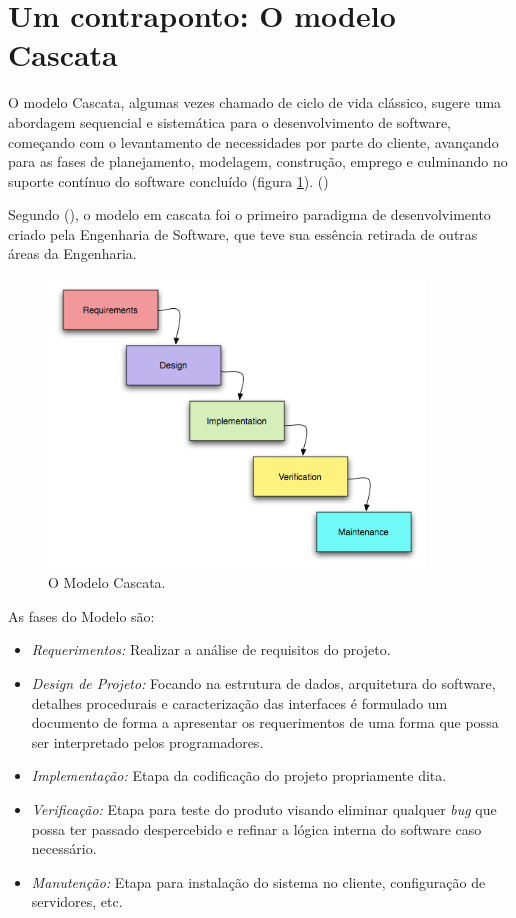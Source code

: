 \section{Um contraponto: O modelo Cascata}
    \par O modelo Cascata, algumas vezes chamado de ciclo de vida clássico, sugere uma abordagem sequencial e sistemática para o desenvolvimento de software, começando com o levantamento de necessidades por parte do cliente, avançando para as fases de planejamento, modelagem, construção, emprego e culminando no suporte contínuo do software concluído (figura \ref{fig:waterfall}). (\cite{pressman:11})
    \par Segundo (\cite{pressman:11}), o modelo em cascata foi o primeiro paradigma de desenvolvimento criado pela Engenharia de Software, que teve sua essência retirada de outras áreas da Engenharia.
\begin{figure}[htb]
\centering
\includegraphics[width=10cm]{figuras/waterfall}
\caption{\label{fig:waterfall}O Modelo Cascata.}
\end{figure}
	\par As fases do Modelo são:
\begin{itemize}
\item \emph{ Requerimentos:} Realizar a análise de requisitos do projeto.
\item \emph{ Design de Projeto:}  Focando na estrutura de dados, arquitetura do software, detalhes procedurais e caracterização das interfaces é formulado um documento de forma a apresentar os requerimentos de uma forma que possa ser interpretado pelos programadores.
\item \emph{ Implementação:} Etapa da codificação do projeto propriamente dita.
\item \emph{  Verificação: } Etapa para teste do produto visando eliminar qualquer \emph{bug} que possa ter passado despercebido e refinar a lógica interna do software caso necessário.
\item \emph{ Manutenção: } Etapa para instalação do sistema no cliente, configuração de servidores, etc.
\end{itemize}

